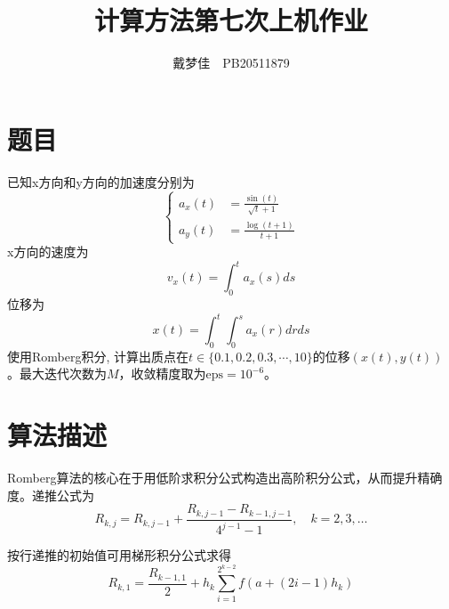 \documentclass[english]{ctexart}
\begin{document}
\title{计算方法第七次上机作业}
\author{戴梦佳\ \ PB20511879}
\maketitle

\section{题目}

已知x方向和y方向的加速度分别为
\begin{equation}
\begin{cases}
a_{x}(t) & =\frac{\sin(t)}{\sqrt{t}+1}\\
a_{y}(t) & =\frac{\log(t+1)}{t+1}
\end{cases}
\end{equation}
x方向的速度为
\begin{equation}
v_{x}(t)=\int_{0}^{t}a_{x}(s)ds
\end{equation}
位移为
\begin{equation}
x(t)=\int_{0}^{t}\int_{0}^{s}a_{x}(r)drds
\end{equation}
使用Romberg积分, 计算出质点在$t\in\{0.1,0.2,0.3,\cdots,10\}$的位移$(x(t),y(t))$。最大迭代次数为$M$，收敛精度取为$\mathrm{eps=10^{-6}}$。

\section{算法描述}

Romberg算法的核心在于用低阶求积分公式构造出高阶积分公式，从而提升精确度。递推公式为
\begin{equation}
\ensuremath{R_{k,j}=R_{k,j-1}+\frac{R_{k,j-1}-R_{k-1,j-1}}{4^{j-1}-1},\quad k=2,3,\ldots}
\end{equation}

按行递推的初始值可用梯形积分公式求得
\begin{equation}
\ensuremath{R_{k,1}=\frac{R_{k-1,1}}{2}+h_{k}\sum_{i=1}^{2^{k-2}}f\left(a+(2i-1)h_{k}\right)}
\end{equation}
\end{document}
